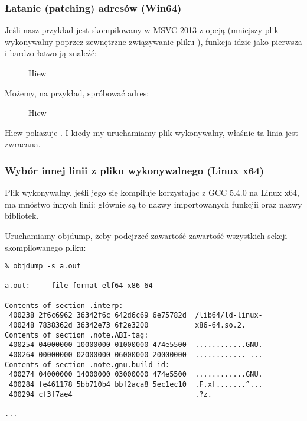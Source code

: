 \subsubsection{Łatanie (patching) adresów (Win64)}

Jeśli nasz przykład jest skompilowany w MSVC 2013 z opcją 
(mniejszy plik wykonywalny poprzez zewnętrzne związywanie pliku ),
funkcja \main idzie jako pierwsza i bardzo łatwo ją znaleźć:

\begin{figure}[H]
\centering
{}
\caption{Hiew}
\label{}
\end{figure}

Możemy, na przykład, spróbować  adres:

\begin{figure}[H]
\centering
{}
\caption{Hiew}
\label{}
\end{figure}

Hiew pokazuje .
I kiedy my uruchamiamy plik wykonywalny, właśnie ta linia jest zwracana.

\subsubsection{Wybór innej linii z pliku wykonywalnego (Linux x64)}

Plik wykonywalny, jeśli jego się kompiluje korzystając z GCC 5.4.0 na Linux x64, ma mnóstwo innych linii:
głównie są to nazwy importowanych funkcjii oraz nazwy bibliotek.

Uruchamiamy objdump, żeby podejrzeć zawartość zawartość wszystkich sekcji skompilowanego pliku:

\begin{lstlisting}
% objdump -s a.out

a.out:     file format elf64-x86-64

Contents of section .interp:
 400238 2f6c6962 36342f6c 642d6c69 6e75782d  /lib64/ld-linux-
 400248 7838362d 36342e73 6f2e3200           x86-64.so.2.
Contents of section .note.ABI-tag:
 400254 04000000 10000000 01000000 474e5500  ............GNU.
 400264 00000000 02000000 06000000 20000000  ............ ...
Contents of section .note.gnu.build-id:
 400274 04000000 14000000 03000000 474e5500  ............GNU.
 400284 fe461178 5bb710b4 bbf2aca8 5ec1ec10  .F.x[.......^...
 400294 cf3f7ae4                             .?z.

...
\end{lstlisting}

